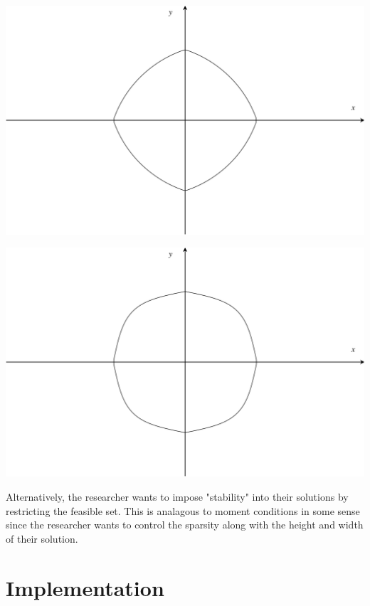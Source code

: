 \documentclass[12pt, a4paper, reqno]{article}
\numberwithin{equation}{section}
\begin{document}
\begin{center}
\begin{minipage}{.5\textwidth}
  \centering
  \includegraphics[width=.9\linewidth]{elasticnet.png}
\end{minipage}%
\begin{minipage}{.5\textwidth}
  \centering
  \includegraphics[width=.9\linewidth]{new_penalty_4_moment.png}
\end{minipage}
\end{center}

Alternatively, the researcher wants to impose "stability" into their solutions by restricting the feasible set.
This is analagous to moment conditions in some sense since the researcher wants to control the sparsity along with the height and width of their solution.


\section{Implementation}
\end{document}

